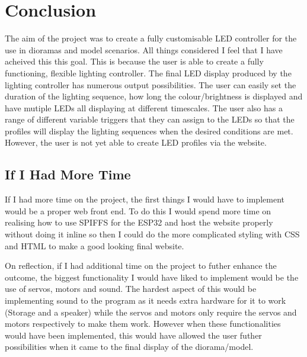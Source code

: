 \section{Conclusion}
The aim of the project was to create a fully customisable LED controller for the use in dioramas and model scenarios. All things considered I feel that I have acheived this this goal. This is because the user is able to create a fully functioning, flexible lighting controller.  The final LED display produced by the lighting controller has numerous output possibilities.  The user can easily set the duration of the lighting sequence, how long the colour/brightness is displayed and have mutiple LEDs all displaying at different timescales. The user also has a range of different variable triggers that they can assign to the LEDs so that the profiles will display the lighting sequences when the desired conditions are met.  However, the user is not yet able to create LED profiles via the website. 

\subsection{If I Had More Time}
If I had more time on the project, the first things I would have to implement would be a proper web front end. To do this I would spend more time on realising how to use SPIFFS for the ESP32 and host the website properly without doing it inline so then I could do the more complicated styling with CSS and HTML to make a good looking final website. 

On reflection, if I had additional time on the project to futher enhance the outcome, the biggest functionality I would have liked to implement would be the use of servos, motors and sound. The hardest aspect of this would be implementing sound to the program as it needs extra hardware for it to work (Storage and a speaker) while the servos and motors only require the servos and motors respectively to make them work. However when these functionalities would have been implemented, this would have allowed the user futher possibilities when it came to the final display of the diorama/model. 




